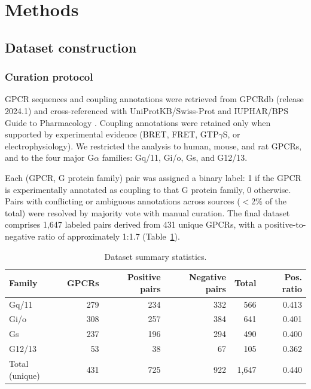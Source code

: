 \documentclass[11pt,a4paper]{article}
\begin{document}
\section{Methods}

\subsection{Dataset construction}

\subsubsection{Curation protocol}

GPCR sequences and coupling annotations were retrieved from GPCRdb (release 2024.1) \cite{kooistra2021gpcrdb, pandy2023gpcrdb} and cross-referenced with UniProtKB/Swiss-Prot \cite{uniprot2023uniprot} and IUPHAR/BPS Guide to Pharmacology \cite{harding2024iuphar}. Coupling annotations were retained only when supported by experimental evidence (BRET, FRET, GTP$\gamma$S, or electrophysiology). We restricted the analysis to human, mouse, and rat GPCRs, and to the four major G$\alpha$ families: Gq/11, Gi/o, Gs, and G12/13.

Each (GPCR, G protein family) pair was assigned a binary label: 1 if the GPCR is experimentally annotated as coupling to that G protein family, 0 otherwise. Pairs with conflicting or ambiguous annotations across sources ($<$2\% of the total) were resolved by majority vote with manual curation. The final dataset comprises 1,647 labeled pairs derived from 431 unique GPCRs, with a positive-to-negative ratio of approximately 1:1.7 (Table~\ref{tab:dataset}).

\begin{table}[t]
\centering
\caption{Dataset summary statistics.}
\label{tab:dataset}
\begin{tabular}{lrrrrr}
\toprule
Family & GPCRs & Positive pairs & Negative pairs & Total & Pos. ratio \\
\midrule
Gq/11  & 279 & 234 & 332 & 566 & 0.413 \\
Gi/o   & 308 & 257 & 384 & 641 & 0.401 \\
Gs     & 237 & 196 & 294 & 490 & 0.400 \\
G12/13 &  53 &  38 &  67 & 105 & 0.362 \\
\midrule
Total (unique) & 431 & 725 & 922 & 1,647 & 0.440 \\
\bottomrule
\end{tabular}
\end{table}
\end{document}
